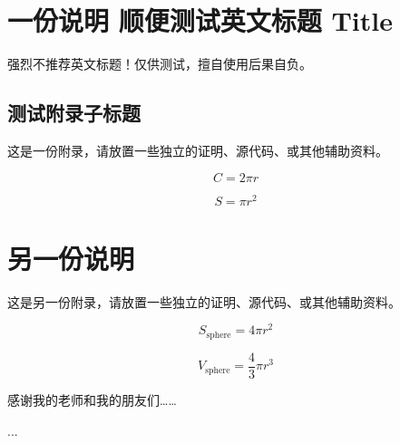\documentclass[lang=chs, degree=master, blindreview=false, adobe=false]{yanputhesis}
\begin{document}
\chapter{一份说明 顺便测试英文标题 Title}

强烈不推荐英文标题！仅供测试，擅自使用后果自负。

\section{测试附录子标题}

这是一份附录，请放置一些独立的证明、源代码、或其他辅助资料。


\begin{equation}
    C = 2 \pi r
\end{equation}

\begin{equation}
    S = \pi r^2
\end{equation}

\cleardoublepage

\chapter{另一份说明}

这是另一份附录，请放置一些独立的证明、源代码、或其他辅助资料。


\begin{equation}
    S_{\text{sphere}} = 4 \pi r^2
\end{equation}

\begin{equation}
    V_{\text{sphere}} = \frac43 \pi r^3
\end{equation}

\cleardoublepage
\backmatter                                                 %
\begin{acknowledgements}                                    %
    感谢我的老师和我的朋友们……
\end{acknowledgements}                                      %
\begin{accomplishments}                                     %
    [1] ...
\end{accomplishments}                                       %
\makestatement                                              %
\end{document}
